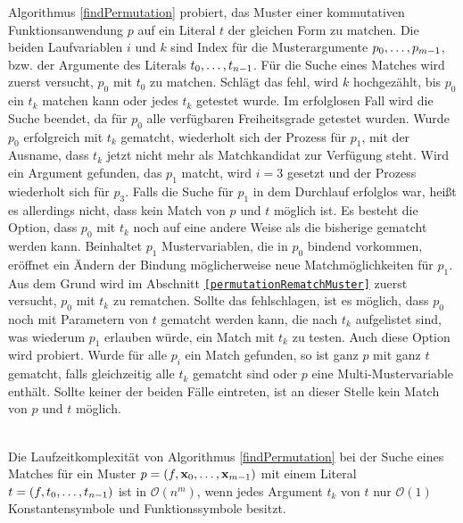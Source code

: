Algorithmus \ref{findPermutation} probiert, das Muster einer kommutativen Funktionsanwendung $p$ auf ein Literal $t$ der gleichen Form zu matchen. Die beiden Laufvariablen $i$ und $k$ sind Index für die Musterargumente ${p}_{0}, \dots, {p}_{m-1}$, bzw. der Argumente des Literals ${t}_{0}, \dots, {t}_{n-1}$. Für die Suche eines Matches wird zuerst versucht, $p_0$ mit $t_0$ zu matchen. Schlägt das fehl, wird $k$ hochgezählt, bis $p_0$ ein $t_k$ matchen kann oder jedes $t_k$ getestet wurde. Im erfolglosen Fall wird die Suche beendet, da für $p_0$ alle verfügbaren Freiheitsgrade getestet wurden. Wurde $p_0$ erfolgreich mit $t_k$ gematcht, wiederholt sich der Prozess für $p_1$, mit der Ausname, dass $t_k$ jetzt nicht mehr als Matchkandidat zur Verfügung steht. Wird ein Argument gefunden, das $p_1$ matcht, wird $i = 3$ gesetzt und der Prozess wiederholt sich für $p_3$. Falls die Suche für $p_1$ in dem Durchlauf erfolglos war, heißt es allerdings nicht, dass kein Match von $p$ und $t$ möglich ist. Es besteht die Option, dass $p_0$ mit $t_k$ noch auf eine andere Weise als die bisherige gematcht werden kann. Beinhaltet $p_1$ Mustervariablen, die in $p_0$ bindend vorkommen, eröffnet ein Ändern der Bindung möglicherweise neue Matchmöglichkeiten für $p_1$. Aus dem Grund wird im Abschnitt \texttt{\ref{permutationRematchMuster}} zuerst versucht, $p_0$ mit $t_k$ zu rematchen. Sollte das fehlschlagen, ist es möglich, dass $p_0$ noch mit Parametern von $t$ gematcht werden kann, die nach $t_k$ aufgelistet sind, was wiederum $p_1$ erlauben würde, ein Match mit $t_k$ zu testen. Auch diese Option wird probiert.
Wurde für alle $p_i$ ein Match gefunden, so ist ganz $p$ mit ganz $t$ gematcht, falls gleichzeitig alle $t_k$ gematcht sind oder $p$ eine Multi-Mustervariable enthält. Sollte keiner der beiden Fälle eintreten, ist an dieser Stelle kein Match von $p$ und $t$ möglich. 


\begin{lemma}\label{lemKomplexitaetFindPermutation}~\\
Die Laufzeitkomplexität von Algorithmus \ref{findPermutation} bei der Suche eines Matches für ein Muster $p = (f, {\mathbf x}_{0}, \dots, {\mathbf x}_{m-1})$ mit einem Literal $t = (f, {t}_{0}, \dots, {t}_{n-1})$ ist in $\mathcal O(n^m)$, wenn jedes Argument $t_k$ von $t$ nur $\mathcal O(1)$ Konstantensymbole und Funktionssymbole besitzt.
\end{lemma}

